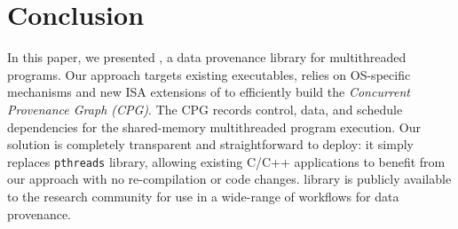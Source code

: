 \section{Conclusion}
\label{sec:conclusion}

In this paper, we presented \projecttitle, a data provenance library for multithreaded programs. Our approach targets existing executables, relies on OS-specific mechanisms and new ISA extensions of \intelpt  to efficiently build the {\em Concurrent Provenance Graph (CPG)}. The CPG records control, data, and schedule dependencies for the shared-memory multithreaded program execution. Our solution is completely transparent and straightforward to deploy: it simply replaces {\tt pthreads} library, allowing existing C/C++ applications to benefit from our approach with no re-compilation or code changes. \projecttitle library is publicly available to the research community for use in a wide-range of workflows for data provenance.

